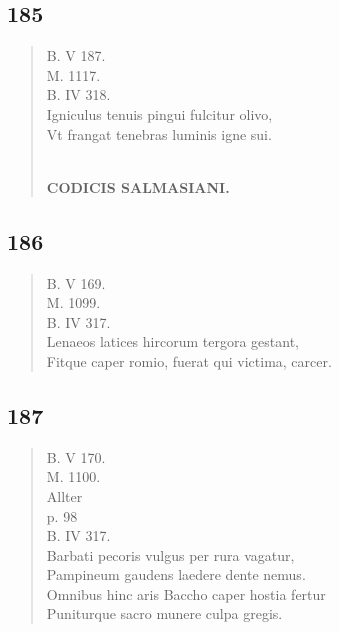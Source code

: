 \documentclass[11pt, a4paper]{report}
\begin{document}
            \subsection*{185}
      \begin{verse}
      B. V 187. \\ M. 1117. \\ B. IV 318. \\ Igniculus tenuis pingui fulcitur olivo, \\ Vt frangat tenebras luminis igne sui. \\ 
        ﻿\pagebreak 
    \begin{center} \textbf{CODICIS SALMASIANI.} \end{center} \marginpar{[157]} 
      \end{verse}
  
            \subsection*{186}
      \begin{verse}
      B. V 169. \\ M. 1099. \\ B. IV 317. \\ Lenaeos latices hircorum tergora gestant, \\ Fitque caper romio, fuerat qui victima, carcer. \\ 
      \end{verse}
  
            \subsection*{187}
      \begin{verse}
      B. V 170. \\ M. 1100. \\ Allter \\ p. 98 \\ B. IV 317. \\ Barbati pecoris vulgus per rura vagatur, \\ Pampineum gaudens laedere dente nemus. \\ Omnibus hinc aris Baccho caper hostia fertur \\ Puniturque sacro munere culpa gregis. \\ 
      \end{verse}
  
\end{document}
